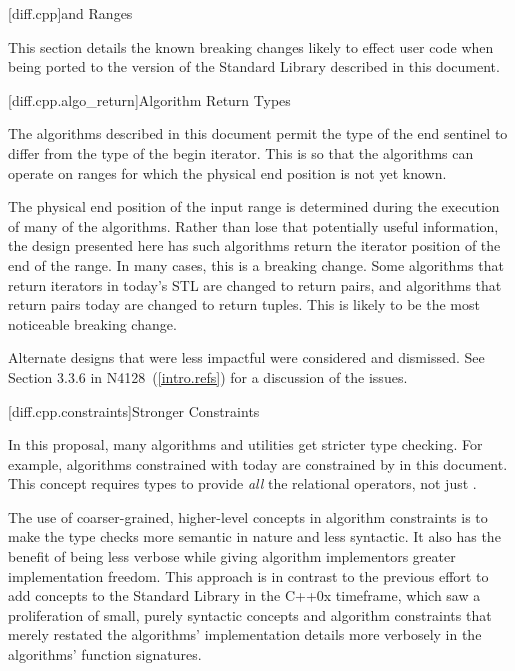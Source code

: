 
[diff.cpp]{\Cpp and Ranges}

\pnum
This section details the known breaking changes likely to effect user code when being ported to the
version of the Standard Library described in this document.

[diff.cpp.algo_return]{Algorithm Return Types}

\pnum
The algorithms described in this document permit the type of the end sentinel to differ from the
type of the begin iterator. This is so that the algorithms can operate on ranges for which the
physical end position is not yet known.

\pnum
The physical end position of the input range is determined during the execution of many of the
algorithms. Rather than lose that potentially useful information, the design presented here has such
algorithms return the iterator position of the end of the range. In many cases, this is a breaking
change. Some algorithms that return iterators in today's STL are changed to return pairs, and
algorithms that return pairs today are changed to return tuples. This is likely to be the most
noticeable breaking change.

\pnum
Alternate designs that were less impactful were considered and dismissed. See Section 3.3.6 in
N4128~(\ref{intro.refs}) for a discussion of the issues.

[diff.cpp.constraints]{Stronger Constraints}

\pnum
In this proposal, many algorithms and utilities get stricter type checking. For example, algorithms
constrained with  today are constrained by  in this
document. This concept requires types to provide \textit{all} the relational operators, not just
.

\pnum
The use of coarser-grained, higher-level concepts in algorithm constraints is to make the type
checks more semantic in nature and less syntactic. It also has the benefit of being less verbose
while giving algorithm implementors greater implementation freedom. This approach is in contrast to
the previous effort to add concepts to the Standard Library in the C++0x timeframe, which saw a
proliferation of small, purely syntactic concepts and algorithm constraints that merely restated the
algorithms' implementation details more verbosely in the algorithms' function signatures.

